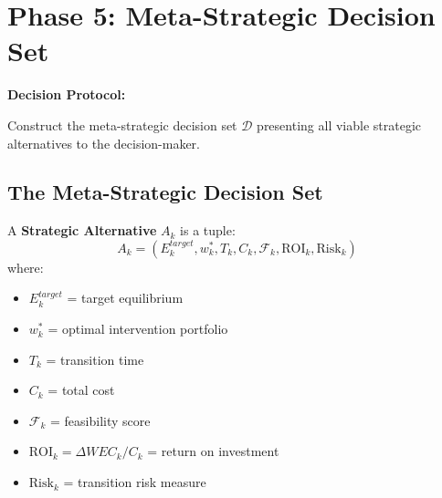 \section{Phase 5: Meta-Strategic Decision Set}
\label{sec:meq-decision}

\begin{tcolorbox}[colback=green!5!white, colframe=green!75!black,
    title=Question 5: What Are the Strategic Alternatives?]

\textbf{Decision Protocol:}

Construct the meta-strategic decision set $\mathcal{D}$ presenting all viable
strategic alternatives to the decision-maker.

\end{tcolorbox}

\subsection{The Meta-Strategic Decision Set}

\begin{definition}
A \textbf{Strategic Alternative} $A_k$ is a tuple:
\begin{equation}
A_k = \left( E^{target}_k, w^*_k, T_k, C_k, \mathcal{F}_k, \text{ROI}_k, \text{Risk}_k \right)
\end{equation}
where:
\begin{itemize}[nosep]
    \item $E^{target}_k$ = target equilibrium
    \item $w^*_k$ = optimal intervention portfolio
    \item $T_k$ = transition time
    \item $C_k$ = total cost
    \item $\mathcal{F}_k$ = feasibility score
    \item $\text{ROI}_k = \Delta WEC_k / C_k$ = return on investment
    \item $\text{Risk}_k$ = transition risk measure
\end{itemize}
\end{definition}

